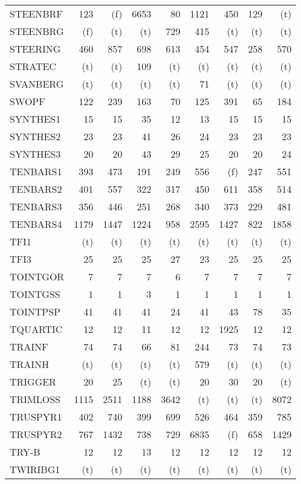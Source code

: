 \documentclass[11pt,twoside]{article}
\begin{document}
{\begin{longtable}[c]{|l|r|r|r|r|r|r|r|r|}
 STEENBRF & 123 & (f) & 6653 & 80 & 1121 & 450 & 129 & (t) \\
 STEENBRG & (f) & (t) & (t) & 729 & 415 & (t) & (t) & (t) \\
 STEERING & 460 & 857 & 698 & 613 & 454 & 547 & 258 & 570 \\
 STRATEC & (t) & (t) & 109 & (t) & (t) & (t) & (t) & (t) \\
 SVANBERG & (t) & (t) & (t) & (t) & 71 & (t) & (t) & (t) \\
 SWOPF & 122 & 239 & 163 & 70 & 125 & 391 & 65 & 184 \\
 SYNTHES1 & 15 & 15 & 35 & 12 & 13 & 15 & 15 & 15 \\
 SYNTHES2 & 23 & 23 & 41 & 26 & 24 & 23 & 23 & 23 \\
 SYNTHES3 & 20 & 20 & 43 & 29 & 25 & 20 & 20 & 24 \\
 TENBARS1 & 393 & 473 & 191 & 249 & 556 & (f) & 247 & 551 \\
 TENBARS2 & 401 & 557 & 322 & 317 & 450 & 611 & 358 & 514 \\
 TENBARS3 & 356 & 446 & 251 & 268 & 340 & 373 & 229 & 481 \\
 TENBARS4 & 1179 & 1447 & 1224 & 958 & 2595 & 1427 & 822 & 1858 \\
 TFI1 & (t) & (t) & (t) & (t) & (t) & (t) & (t) & (t) \\
 TFI3 & 25 & 25 & 25 & 27 & 23 & 25 & 25 & 25 \\
 TOINTGOR & 7 & 7 & 7 & 6 & 7 & 7 & 7 & 7 \\
 TOINTGSS & 1 & 1 & 3 & 1 & 1 & 1 & 1 & 1 \\
 TOINTPSP & 41 & 41 & 41 & 24 & 41 & 43 & 78 & 35 \\
 TQUARTIC & 12 & 12 & 11 & 12 & 12 & 1925 & 12 & 12 \\
 TRAINF & 74 & 74 & 66 & 81 & 244 & 73 & 74 & 73 \\
 TRAINH & (t) & (t) & (t) & (t) & 579 & (t) & (t) & (t) \\
 TRIGGER & 20 & 25 & (t) & (t) & 20 & 30 & 20 & (t) \\
 TRIMLOSS & 1115 & 2511 & 1188 & 3642 & (t) & (t) & (t) & 8072 \\
 TRUSPYR1 & 402 & 740 & 399 & 699 & 526 & 464 & 359 & 785 \\
 TRUSPYR2 & 767 & 1432 & 738 & 729 & 6835 & (f) & 658 & 1429 \\
 TRY-B & 12 & 12 & 13 & 12 & 12 & 12 & 12 & 12 \\
 TWIRIBG1 & (t) & (t) & (t) & (t) & (t) & (t) & (t) & (t) \\

\end{longtable}}
\end{document}
